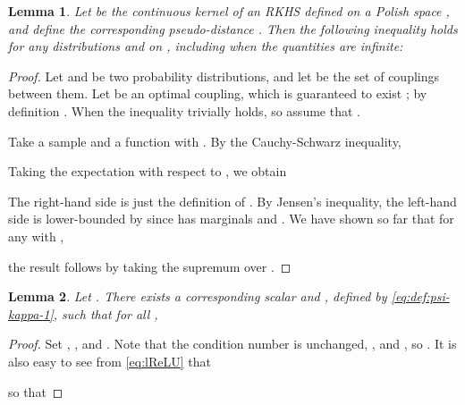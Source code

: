 \documentclass{article}
\let\citep\parencite
\newtheorem{lem}{Lemma}
\begin{document}
\begin{lem} \label{thm:mmd-w-upperbound}
  Let  be the continuous kernel of an RKHS  defined on a Polish space , and define the corresponding pseudo-distance . Then the following  inequality holds for any distributions  and  on , including when the quantities are infinite:
  
\end{lem}
\begin{proof}
Let  and  be two probability distributions,
and let  be the set of couplings between them.
Let  be an optimal coupling,
which is guaranteed to exist \citep[Theorem 4.1]{Villani:2009};
by definition .
When  the inequality trivially holds, so assume that .

Take a sample  and a function  with  . By the Cauchy-Schwarz inequality,


Taking the expectation with respect to , we obtain

The right-hand side is just the definition of .
By Jensen's inequality, the left-hand side is lower-bounded by
 since  has marginals  and .
We have shown so far that for any  with ,

the result follows by taking the supremum over .
\end{proof}

\begin{lem}
  \label{appendix:prop:pseudo_homogeneity}
  Let .
  There exists a corresponding scalar  and
  ,
  defined by \eqref{eq:def:psi-kappa-1},
  such that for all ,
  
\end{lem}
\begin{proof}
Set , ,
and .
Note that the condition number is unchanged,
,
and ,
so .
It is also easy to see from \eqref{eq:lReLU} that

so that

\end{proof}
\end{document}
